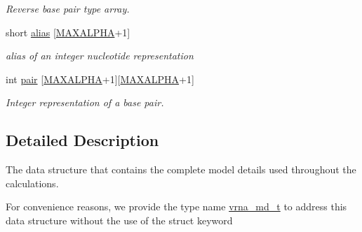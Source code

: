 \begin{DoxyCompactItemize}
\begin{DoxyCompactList}\small\item\em Reverse base pair type array. \end{DoxyCompactList}\item 
short \hyperlink{structvrna__md__s_a66136cf9abc8ff790ec0d33245d68fd5}{alias} \mbox{[}\hyperlink{group__model__details_ga05a5ffe718aa431d97419a12fb082379}{M\+A\+X\+A\+L\+P\+HA}+1\mbox{]}\hypertarget{structvrna__md__s_a66136cf9abc8ff790ec0d33245d68fd5}{}\label{structvrna__md__s_a66136cf9abc8ff790ec0d33245d68fd5}

\begin{DoxyCompactList}\small\item\em alias of an integer nucleotide representation \end{DoxyCompactList}\item 
int \hyperlink{structvrna__md__s_ab4da594c638707e212f64aadb54a7454}{pair} \mbox{[}\hyperlink{group__model__details_ga05a5ffe718aa431d97419a12fb082379}{M\+A\+X\+A\+L\+P\+HA}+1\mbox{]}\mbox{[}\hyperlink{group__model__details_ga05a5ffe718aa431d97419a12fb082379}{M\+A\+X\+A\+L\+P\+HA}+1\mbox{]}\hypertarget{structvrna__md__s_ab4da594c638707e212f64aadb54a7454}{}\label{structvrna__md__s_ab4da594c638707e212f64aadb54a7454}

\begin{DoxyCompactList}\small\item\em Integer representation of a base pair. \end{DoxyCompactList}\end{DoxyCompactItemize}


\subsection{Detailed Description}
The data structure that contains the complete model details used throughout the calculations. 

For convenience reasons, we provide the type name \hyperlink{group__model__details_ga1f8a10e12a0a1915f2a4eff0b28ea17c}{vrna\+\_\+md\+\_\+t} to address this data structure without the use of the struct keyword

